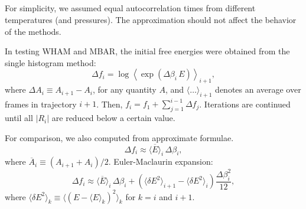 \documentclass[aip,jcp,preprint,superscriptaddress]{revtex4-1}
\begin{document}
\subsection{\label{sec:results_setup}
}



For simplicity,
we assumed equal autocorrelation times
from different temperatures (and pressures).
%
The approximation should not affect
the  behavior of the methods.



In testing WHAM and MBAR,
the initial free energies were obtained from
the single histogram method:
%
\begin{equation*}
\Delta f_i
=
\log
\left\langle
  \exp\left(
    \Delta \beta_i \, E
  \right)
\right\rangle_{i+1},
\end{equation*}
%
where $\Delta A_i \equiv A_{i+1} - A_i$,
for any quantity $A$,
and
$\langle\dots\rangle_{i + 1}$
denotes an average over frames in trajectory $i + 1$.
%
Then, $f_i = f_1 + \sum_{j = 1}^{i - 1} \Delta f_j$.
%
%
Iterations are continued
until all $|R_i|$ are reduced
below a certain value.



For comparison,
we also computed 
from  approximate formulae.
%
\cite{park2007}
%
\begin{equation}
\Delta f_i
\approx
\overline{ \langle E \rangle }_i \, \Delta \beta_i,
\label{eq:df_eav}
\end{equation}
where
$\overline{ A }_i \equiv (A_{i+1} + A_i)/2$.
%
Euler-Maclaurin expansion\cite{
arfken, *abramowitz, *wang_specfunc, whittaker}:
%
\begin{equation}
\Delta f_i
\approx
\overline{ \langle E \rangle }_i \, \Delta \beta_i
+
\left(
  \langle \delta E^2 \rangle_{i+1}
-
  \langle \delta E^2 \rangle_i
\right)
\frac{ \Delta \beta_i^2 }{ 12 },
\label{eq:df_eavb}
\end{equation}
%
where
$\langle \delta E^2 \rangle_k
\equiv \langle (E - \langle E \rangle_k)^2 \rangle_k$
for $k = i$ and $i + 1$.
%
\end{document}
